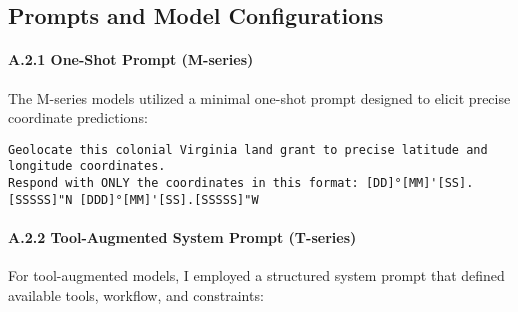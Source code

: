 \subsection{Prompts and Model Configurations}\label{sec:prompts}

\paragraph{A.2.1 One-Shot Prompt
(M-series)}\label{a.2.1-one-shot-prompt-m-series}

The M-series models utilized a minimal one-shot prompt designed to
elicit precise coordinate predictions:

\begin{lstlisting}
Geolocate this colonial Virginia land grant to precise latitude and longitude coordinates.
Respond with ONLY the coordinates in this format: [DD]°[MM]'[SS].[SSSSS]"N [DDD]°[MM]'[SS].[SSSSS]"W
\end{lstlisting}

\paragraph{A.2.2 Tool-Augmented System Prompt
(T-series)}\label{a.2.2-tool-augmented-system-prompt-t-series}

For tool-augmented models, I employed a structured system prompt that
defined available tools, workflow, and constraints:

